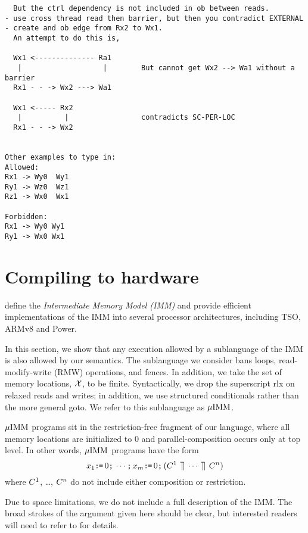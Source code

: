 \begin{verbatim}
  But the ctrl dependency is not included in ob between reads.
- use cross thread read then barrier, but then you contradict EXTERNAL
- create and ob edge from Rx2 to Wx1.
  An attempt to do this is, 

  Wx1 <-------------- Ra1       
   |                   |        But cannot get Wx2 --> Wa1 without a barrier
  Rx1 - - -> Wx2 ---> Wa1       

  Wx1 <----- Rx2                         
   |          |                 contradicts SC-PER-LOC 
  Rx1 - - -> Wx2                         


Other examples to type in:
Allowed:
Rx1 -> Wy0  Wy1
Ry1 -> Wz0  Wz1
Rz1 -> Wx0  Wx1

Forbidden:
Rx1 -> Wy0 Wy1
Ry1 -> Wx0 Wx1

\end{verbatim}


\section{Compiling to hardware}

\citet{DBLP:journals/pacmpl/PodkopaevLV19} define the \emph{Intermediate
  Memory Model (IMM)} and provide efficient implementations of the IMM into
several processor architectures, including TSO, ARMv8 and Power.

In this section, we show that any execution allowed by a sublanguage of the
IMM is also allowed by our semantics.  The sublanguage we consider bans
loops, read-modify-write (RMW) operations, and fences.  In addition, we take
the set of memory locations, $\mathcal{X}$, to be finite.  Syntactically, we drop
the superscript \textsf{rlx} on relaxed reads and writes; in addition, we use
structured conditionals rather than the more general \textsf{goto}.  We refer
to this sublanguage as $\mu\text{IMM}$.

$\mu\text{IMM}$ programs sit in the restriction-free fragment of our language, where
all memory locations are initialized to $0$ and parallel-composition occurs
only at top level.  In other words, $\mu\text{IMM}$ programs have the form
\begin{displaymath}
  {x_1}\texttt{:}\mkern-1mu\texttt{=}\,{0}\texttt{;}\,
  \cdots\texttt{;}\,
  {x_m}\texttt{:}\mkern-1mu\texttt{=}\,{0}\texttt{;}\,
  (C^1 \,\mathbin{\rrceil}\, \cdots \,\mathbin{\rrceil}\, C^n)
\end{displaymath}
where $C^1$, \ldots, $C^n$ do not include either composition or
restriction.

Due to space limitations, we do not include a full description of the IMM.
The broad strokes of the argument given here should be clear, but interested
readers will need to refer to \citep{DBLP:journals/pacmpl/PodkopaevLV19} for
details.

